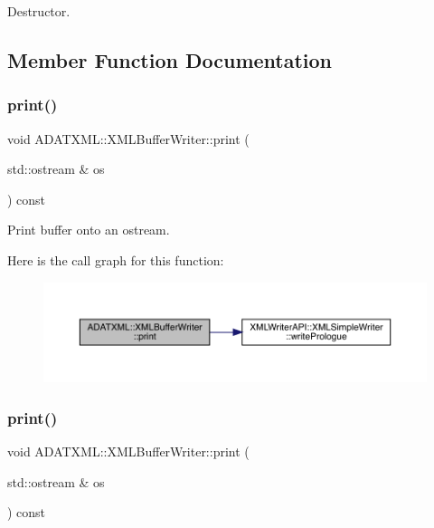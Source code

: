 Destructor. 



\subsection{Member Function Documentation}
\mbox{\label{classADATXML_1_1XMLBufferWriter_a1256054ea792711a5ff2807afd4f6404}} 
\subsubsection{\texorpdfstring{print()}{print()}\hspace{0.1cm}{\footnotesize\ttfamily [1/3]}}
{\footnotesize\ttfamily void A\+D\+A\+T\+X\+M\+L\+::\+X\+M\+L\+Buffer\+Writer\+::print (\begin{DoxyParamCaption}\item[{std\+::ostream \&}]{os }\end{DoxyParamCaption}) const}



Print buffer onto an ostream. 

Here is the call graph for this function\+:
\nopagebreak
\begin{figure}[H]
\begin{center}
\leavevmode
\includegraphics[width=350pt]{d7/de9/classADATXML_1_1XMLBufferWriter_a1256054ea792711a5ff2807afd4f6404_cgraph}
\end{center}
\end{figure}
\mbox{\label{classADATXML_1_1XMLBufferWriter_a1256054ea792711a5ff2807afd4f6404}} 
\subsubsection{\texorpdfstring{print()}{print()}\hspace{0.1cm}{\footnotesize\ttfamily [2/3]}}
{\footnotesize\ttfamily void A\+D\+A\+T\+X\+M\+L\+::\+X\+M\+L\+Buffer\+Writer\+::print (\begin{DoxyParamCaption}\item[{std\+::ostream \&}]{os }\end{DoxyParamCaption}) const}



